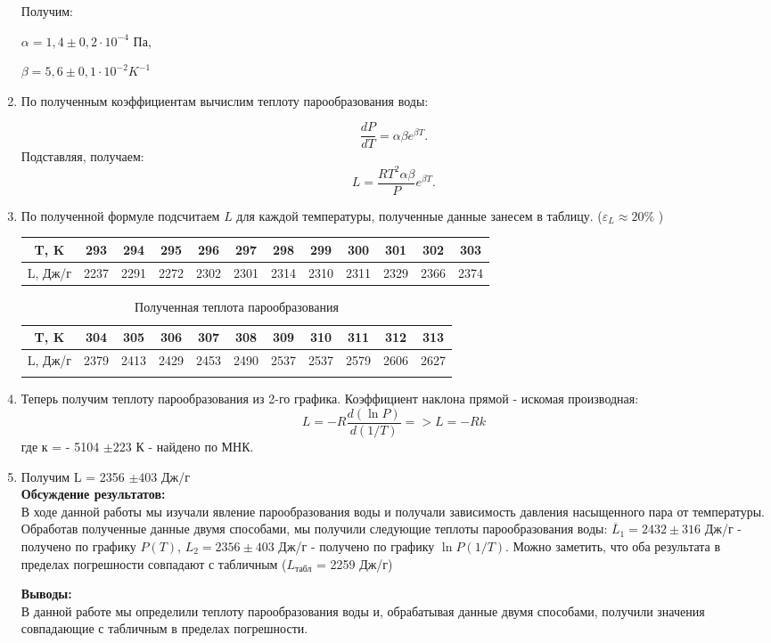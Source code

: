 \documentclass[a4paper, 12pt]{article}%
\begin{document}
\begin{enumerate}
	
	Получим: 
	
	$\alpha = 1,4 \pm 0,2 \cdot 10^{-4} $ Па, 
	
	$\beta = 5,6 \pm 0,1 \cdot 10^{-2} K^{-1}$ 
	
	
	\item По полученным коэффициентам вычислим теплоту парообразования воды:
	
	$$
	\frac{dP}{dT} = \alpha \beta e^{\beta T}.
    $$
    Подставляя, получаем:
    $$
    L=\frac{RT^2\alpha \beta }{P}e^{\beta T}.
    $$
	
	
	\item По полученной формуле подсчитаем $L$ для каждой температуры, полученные данные занесем в таблицу. ($\varepsilon_L \approx 20 \% $ )
	
	\begin{longtable}{|c|c|c|c|c|c|c|c|c|c|c|c|}
		\hline
	T, K& 293& 294& 295&296& 297& 298& 299& 300& 301& 302&303  \\ \hline
	L, Дж/г & 2237& 2291& 2272&2302 & 2301& 2314& 2310& 2311& 2329& 2366& 2374 \\ \hline
	\end{longtable}
	
		\begin{longtable}{|c|c|c|c|c|c|c|c|c|c|c|}\hline
		T, K& 304& 305& 306& 307& 308& 309& 310& 311& 312& 313   \\ \hline
		L, Дж/г & 2379& 2413& 2429& 2453& 2490& 2537& 2537& 2579& 2606& 2627  \\ \hline
		\caption{Полученная теплота парообразования}
	\end{longtable}
	
	
	\item Теперь получим теплоту парообразования из 2-го графика. Коэффициент наклона прямой - искомая производная:
	$$ L =-R\frac{d(\ln P)}{d(1/T)}  => L = -R k$$
	 где к = - 5104 $\pm 223$ К - найдено по МНК.
	\item Получим L = 2356 $\pm 403 $ Дж/г\\
	
	
	
	\textbf{Обсуждение результатов: }\\
	
	В ходе данной работы мы изучали явление парообразования воды и получали зависимость давления насыщенного пара от температуры. Обработав полученные данные двумя способами, мы получили следующие теплоты парообразования воды:
	$\overline L_1 = 2432 \pm 316$ Дж/г - получено по графику $P(T)$,
	$L_2 = 2356 \pm 403$ Дж/г - получено по графику  $\ln P(1/T)$.
	 Можно заметить, что оба результата в пределах погрешности совпадают с табличным ($L_{\text{табл}}$ = 2259 Дж/г)
	
	
	\textbf{Выводы: }\\
	В данной работе мы определили теплоту парообразования воды и, обрабатывая данные двумя способами, получили значения совпадающие с табличным в пределах погрешности.
	
	
	\end{enumerate}
	
\end{document}
